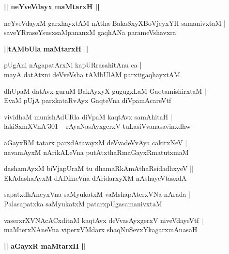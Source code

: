 \documentclass[twoside,12pt,openright]{book}
\newcounter{shloka}[chapter]
\def\uvaca#1{\centerline{{\large\textbf{#1}}}}
\begin{document}
\uvaca{|| neYveVdayx maMtarxH ||}

\begin{shloka}%
neYveVdayxM garxhayxtAM nAtha BakaSxyXBoVjeyxYH samanivxtaM |\\
saveYRraseYsusxsaMpananxM gaqhANa parameVshavxra 
\end{shloka}

\uvaca{||tAMbUla maMtarxH ||}

\begin{shloka}%
pUgAni nAgapatArxNi kapURrasahitAnu ca |\\
mayA datAtxni deVveVsha tAMbUlAM parxtigaqhayxtAM 
\end{shloka}

\begin{shloka}%
dhUpaM datAvx guruM BakAyxyX gugugxLaM GaqtamishirxtaM |\\
EvaM pUjA parxkataRvAyx GaqteVna diVpamAcareVtf
\end{shloka}

\begin{shloka}%
vividhaM munishAdURla diVpaM kaqtAvx samAhitaH |\\
lakiSxmXVnA\char'301 ~ rAyaNasAyxgerxV tuLasiVvanasavinxdhw
\end{shloka}

\begin{shloka}%
aGayxRM tatarx parxdAtavayxM deVvadeVvAya cakirxNeV |\\
navamAyxM nArikALeVna putAtxthaRmaGayxRmatutxmaM
\end{shloka}

\begin{shloka}%
dashamAyxM biVjapUraM tu dhamaRkAmAthaRsidadhxyeV ||\\
EkAdashaAyxM dADimeVna dAridarxyXM nAshayeVtasxdA
\end{shloka}

\begin{shloka}%
sapatxdhAneyxVna saMyukatxM vaMshapAterxVNa nArada |\\
Palasapatxka saMyukatxM patarxpUgasamanivxtaM 
\end{shloka}

\begin{shloka}%
vaserxrXVNAcACxditaM kaqtAvx deVvasAyxgerxV niveVdayeVtf |\\
maMterxNAneVna viperxVMdarx shaqNuSevxYkagarxmAnasaH
\end{shloka}

\uvaca{|| aGayxR maMtarxH ||}
\end{document}

